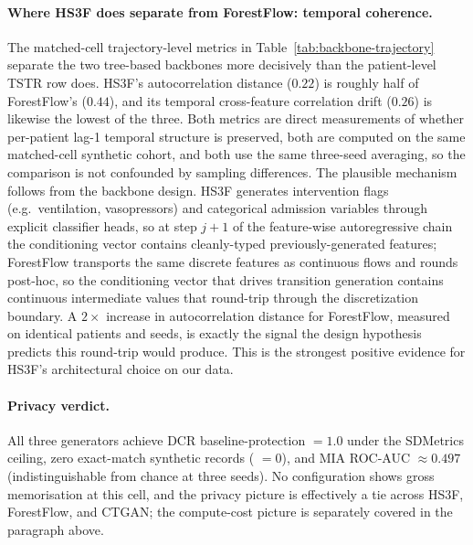\paragraph{Where HS3F does separate from ForestFlow: temporal coherence.}
The matched-cell trajectory-level metrics in Table~\ref{tab:backbone-trajectory} separate the two tree-based backbones more decisively than the patient-level TSTR row does. HS3F's autocorrelation distance ($0.22$) is roughly half of ForestFlow's ($0.44$), and its temporal cross-feature correlation drift ($0.26$) is likewise the lowest of the three. Both metrics are direct measurements of whether per-patient lag-1 temporal structure is preserved, both are computed on the same matched-cell synthetic cohort, and both use the same three-seed averaging, so the comparison is not confounded by sampling differences. The plausible mechanism follows from the backbone design. HS3F generates intervention flags (e.g.\ ventilation, vasopressors) and categorical admission variables through explicit classifier heads, so at step $j+1$ of the feature-wise autoregressive chain the conditioning vector contains cleanly-typed previously-generated features; ForestFlow transports the same discrete features as continuous flows and rounds post-hoc, so the conditioning vector that drives transition generation contains continuous intermediate values that round-trip through the discretization boundary. A $2\times$ increase in autocorrelation distance for ForestFlow, measured on identical patients and seeds, is exactly the signal the design hypothesis predicts this round-trip would produce. This is the strongest positive evidence for HS3F's architectural choice on our data.

\paragraph{Privacy verdict.}
All three generators achieve DCR baseline-protection $= 1.0$ under the SDMetrics ceiling, zero exact-match synthetic records ( $= 0$), and MIA ROC-AUC $\approx 0.497$ (indistinguishable from chance at three seeds). No configuration shows gross memorisation at this cell, and the privacy picture is effectively a tie across HS3F, ForestFlow, and CTGAN; the compute-cost picture is separately covered in the paragraph above.

